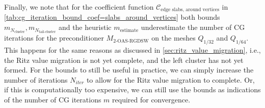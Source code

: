 Finally, we note that for the coefficient function $\mathcal{C}_{\text{edge slabs, around vertices}}$ in \cref{tab:cg_iteration_bound_coef=slabs_around_vertices} both bounds $m_{N_{\text{cluster}}}, m_{N_{\text{tail-cluster}}}$ and the heuristic $m_{\text{estimate}}$ underestimate the number of CG iterations for the preconditioner $M_{\text{2-OAS-RGDSW}}$ on the meshes $Q_{1/32}$ and $Q_{1/64}$. This happens for the same reasons as discussed in \cref{sec:ritz_value_migration}, i.e., the Ritz value migration is not yet complete, and the left cluster has not yet formed. For the bounds to still be useful in practice, we can simply increase the number of iterations $N_{iter}$ to allow for the Ritz value migration to complete. Or, if this is computationally too expensive, we can still use the bounds as indications of the number of CG iterations $m$ required for convergence. 